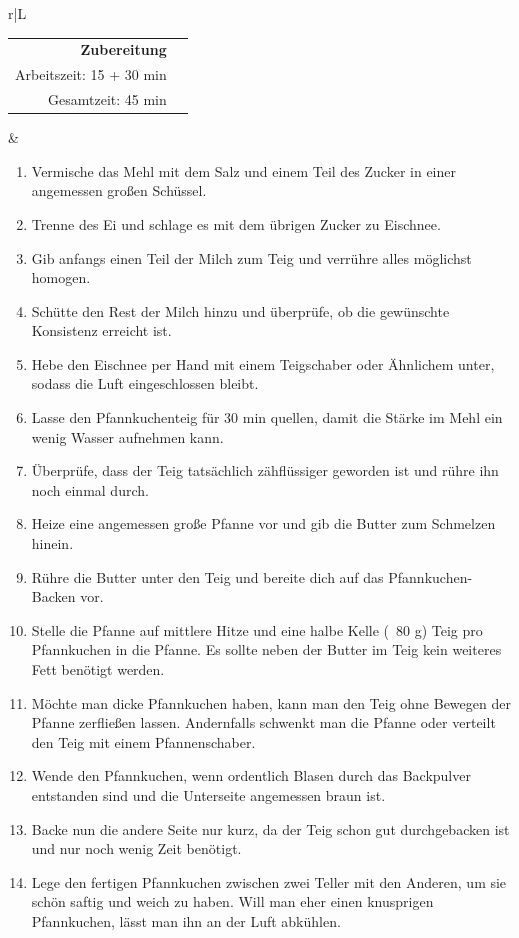\documentclass[a4paper, 12pt]{scrbook} 								%
\numberwithin{equation}{section} 									%
\begin{document}
		\begin{tabularx}{\textwidth}{r|L}
			\begin{tabular}[t]{rr}
				\textbf{Zubereitung}	\\
				Arbeitszeit: 15 + 30 min \\
				Gesamtzeit:	45 min		\\
			\end{tabular}			&	\begin{enumerate}[]
											\item Vermische das Mehl mit dem Salz und einem Teil des Zucker in einer angemessen großen Schüssel.
											\item Trenne des Ei und schlage es mit dem übrigen Zucker zu Eischnee.
											\item Gib anfangs einen Teil der Milch zum Teig und verrühre alles möglichst homogen.
											\item Schütte den Rest der Milch hinzu und überprüfe, ob die gewünschte Konsistenz erreicht ist.
											\item Hebe den Eischnee per Hand mit einem Teigschaber oder Ähnlichem unter, sodass die Luft eingeschlossen bleibt.
											\item Lasse den Pfannkuchenteig für 30 min quellen, damit die Stärke im Mehl ein wenig Wasser aufnehmen kann.
											\item Überprüfe, dass der Teig tatsächlich zähflüssiger geworden ist und rühre ihn noch einmal durch.
											\item Heize eine angemessen große Pfanne vor und gib die Butter zum Schmelzen hinein.
											\item Rühre die Butter unter den Teig und bereite dich auf das Pfannkuchen-Backen vor.
											\item Stelle die Pfanne auf mittlere Hitze und eine halbe Kelle (~80 g) Teig pro Pfannkuchen in die Pfanne. Es sollte neben der Butter im Teig kein weiteres Fett benötigt werden.
											\item Möchte man dicke Pfannkuchen haben, kann man den Teig ohne Bewegen der Pfanne zerfließen lassen. Andernfalls schwenkt man die Pfanne oder verteilt den Teig mit einem Pfannenschaber.
											\item Wende den Pfannkuchen, wenn ordentlich Blasen durch das Backpulver entstanden sind und die Unterseite angemessen braun ist.
											\item Backe nun die andere Seite nur kurz, da der Teig schon gut durchgebacken ist und nur noch wenig Zeit benötigt.
											\item Lege den fertigen Pfannkuchen zwischen zwei Teller mit den Anderen, um sie schön saftig und weich zu haben. Will man eher einen knusprigen Pfannkuchen, lässt man ihn an der Luft abkühlen.
										\end{enumerate}	\\
		\end{tabularx}
\end{document}
